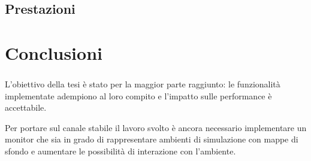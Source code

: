 \documentclass[%
]{beamer}
\begin{document}
        \subsection{Prestazioni}\label{subsec:benchmark}
            \begin{frame}
                \frametitle{\insertsection}
                \framesubtitle{\insertsubsection}
                \centering
                
            \end{frame}
    \section{Conclusioni}\label{sec:conclusioni}
        \begin{frame}
            \frametitle{\insertsection}
            \framesubtitle{\insertsubsection}
            L'obiettivo della tesi è stato per la maggior parte raggiunto: le funzionalità implementate adempiono al loro compito e l'impatto sulle performance è accettabile.

            \bigskip

            Per portare sul canale stabile il lavoro svolto è ancora necessario implementare un monitor che sia in grado di rappresentare ambienti di simulazione con mappe di sfondo e aumentare le possibilità di interazione con l'ambiente.
        \end{frame}
\end{document}
